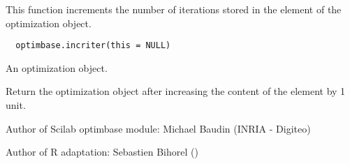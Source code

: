 %
\begin{Description}\relax
This function increments the number of iterations stored in the
 element of the optimization object.
\end{Description}
%
\begin{Usage}
\begin{verbatim}
  optimbase.incriter(this = NULL)
\end{verbatim}
\end{Usage}
%
\begin{Arguments}
\begin{ldescription}
\item[\code{this}] An optimization object.
\end{ldescription}
\end{Arguments}
%
\begin{Value}
Return the optimization object after increasing the content of the
 element by 1 unit.
\end{Value}
%
\begin{Author}\relax
Author of Scilab optimbase module: Michael Baudin (INRIA - Digiteo)

Author of R adaptation: Sebastien Bihorel ()
\end{Author}
